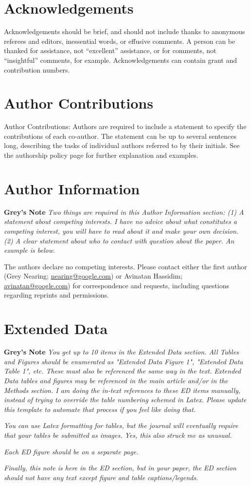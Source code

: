 \documentclass[pdflatex]{sn-jnl}
\begin{document}
\newpage
\section*{Acknowledgements}
Acknowledgements should be brief, and should not include thanks to anonymous referees and editors, inessential words, or effusive comments. A person can be thanked for assistance, not “excellent” assistance, or for comments, not “insightful” comments, for example. Acknowledgements can contain grant and contribution numbers.

\section*{Author Contributions}
Author Contributions: Authors are required to include a statement to specify the contributions of each co-author. The statement can be up to several sentences long, describing the tasks of individual authors referred to by their initials. See the authorship policy page for further explanation and examples.


\section*{Author Information}
\textbf{Grey's Note} \textit{Two things are required in this Author Information section: (1) A statement about competing interests. I have no advice about what constitutes a competing interest, you will have to read about it and make your own decision. (2) A clear statement about who to contact with question about the paper. An example is below.}

The authors declare no competing interests. Please contact either the first author (Grey Nearing; \href{mailto:nearing@google.com}{nearing@google.com}) or Avinatan Hassidim; \href{mailto:avinatan@google.com}{avinatan@google.com}) for correspondence and requests, including questions regarding reprints and permissions.


\newpage
\section*{Extended Data}
\textbf{Grey's Note} \textit{You get up to 10 items in the Extended Data section. All Tables and Figures should be enumerated as "Extended Data Figure 1", "Extended Data Table 1", etc. These must also be referenced the same way in the text. Extended Data tables and figures may be referenced in the main article and/or in the Methods section. I am doing the in-text references to these ED items manually, instead of trying to override the table numbering schemed in Latex. Please update this template to automate that process if you feel like doing that.}

\textit{You can use Latex formatting for tables, but the journal will eventually require that your tables be submitted as images. Yes, this also struck me as unusual.}

\textit{Each ED figure should be on a separate page.}

\textit{Finally, this note is here in the ED section, but in your paper, the ED section should not have any text except figure and table captions/legends.}
\end{document}
